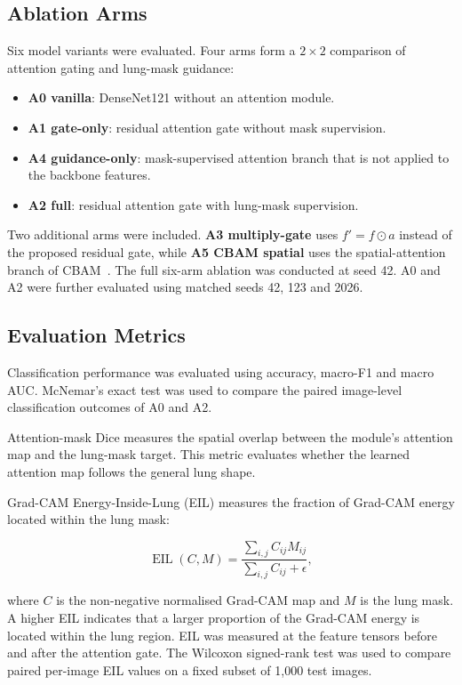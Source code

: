 \documentclass[sigconf,screen,nonacm]{acmart}
\begin{document}
\subsection{Ablation Arms}

Six model variants were evaluated. Four arms form a $2\times2$ comparison of attention gating and lung-mask guidance:

\begin{itemize}
\item \textbf{A0 vanilla}: DenseNet121 without an attention module.
\item \textbf{A1 gate-only}: residual attention gate without mask supervision.
\item \textbf{A4 guidance-only}: mask-supervised attention branch that is not applied to the backbone features.
\item \textbf{A2 full}: residual attention gate with lung-mask supervision.
\end{itemize}

Two additional arms were included. \textbf{A3 multiply-gate} uses $f'=f\odot a$ instead of the proposed residual gate, while \textbf{A5 CBAM spatial} uses the spatial-attention branch of CBAM~\cite{woo2018cbam}. The full six-arm ablation was conducted at seed 42. A0 and A2 were further evaluated using matched seeds 42, 123 and 2026.

\subsection{Evaluation Metrics}

Classification performance was evaluated using accuracy, macro-F1 and macro AUC. McNemar's exact test was used to compare the paired image-level classification outcomes of A0 and A2.

Attention-mask Dice measures the spatial overlap between the module's attention map and the lung-mask target. This metric evaluates whether the learned attention map follows the general lung shape.

Grad-CAM Energy-Inside-Lung (EIL) measures the fraction of Grad-CAM energy located within the lung mask:

\begin{equation}
\operatorname{EIL}(C,M)
=
\frac{\sum_{i,j} C_{ij}M_{ij}}
     {\sum_{i,j} C_{ij}+\epsilon},
\end{equation}

where $C$ is the non-negative normalised Grad-CAM map and $M$ is the lung mask. A higher EIL indicates that a larger proportion of the Grad-CAM energy is located within the lung region. EIL was measured at the feature tensors before and after the attention gate. The Wilcoxon signed-rank test was used to compare paired per-image EIL values on a fixed subset of 1,000 test images.
\end{document}
